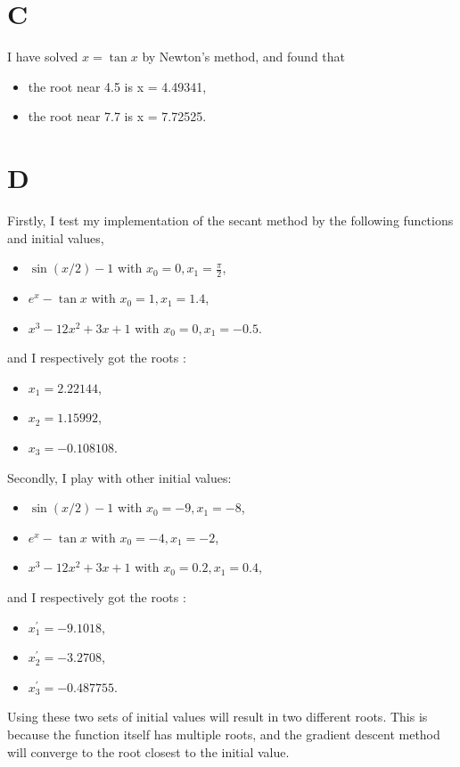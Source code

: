\documentclass[a4paper]{article}
\begin{document}
\section{C}
I have solved $x = \tan x$ by Newton's method, and found that
\begin{itemize}
  \item the root near 4.5 is x = 4.49341,
  \item the root near 7.7 is x = 7.72525.
\end{itemize}

\section{D}
Firstly, I test my implementation of the secant method by the following functions and initial values,
\begin{itemize}
  \item \(\sin(x/2) - 1\) with \(x_0 = 0, x_1 = \frac{\pi}{2}\),
  \item \(e^x - \tan x\) with \(x_0 = 1, x_1 = 1.4\),
  \item \(x^3 - 12x^2 + 3x + 1\) with \(x_0 = 0, x_1 = -0.5\).
\end{itemize}
and I respectively got the roots :
\begin{itemize}
  \item $x_1 = 2.22144$,
  \item $x_2 = 1.15992$,
  \item $x_3 = -0.108108$.
\end{itemize}

Secondly, I play with other initial values:
\begin{itemize}
  \item \(\sin(x/2) - 1\) with \(x_0 = -9, x_1 = -8\),
  \item \(e^x - \tan x\) with \(x_0 = -4, x_1 = -2\),
  \item \(x^3 - 12x^2 + 3x + 1\) with \(x_0 = 0.2, x_1 = 0.4\),
\end{itemize}
and I respectively got the roots :
\begin{itemize}
  \item $x_{1}^{'} = -9.1018$,
  \item $x_{2}^{'} = -3.2708$,
  \item $x_{3}^{'} = -0.487755$.
\end{itemize}

Using these two sets of initial values will result in two different roots. This is because the function itself has multiple roots, and the gradient descent method will converge to the root closest to the initial value.
\end{document}
